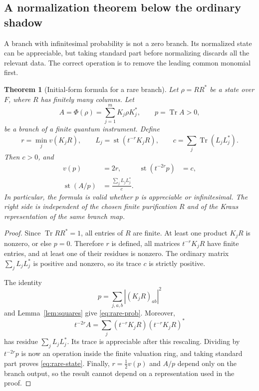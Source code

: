 \documentclass[11pt,oneside]{article}
\numberwithin{equation}{section}
\theoremstyle{plain}
\newtheorem{theorem}{Theorem}[section]
\theoremstyle{definition}
\theoremstyle{remark}
\newcommand{\st}{\operatorname{st}}
\newcommand{\Tr}{\operatorname{Tr}}
\newcommand{\abs}[1]{\left|#1\right|}
\begin{document}
\subsection{A normalization theorem below the ordinary shadow}
A branch with infinitesimal probability is not a zero branch. Its normalized state can be appreciable, but taking standard part before normalizing discards all the relevant data. The correct operation is to remove the leading common monomial first.

\begin{theorem}[Initial-form formula for a rare branch]\label{thm:rare}
Let $\rho=RR^*$ be a state over $F$, where $R$ has finitely many columns. Let
\[
 A=\Phi(\rho)=\sum_{j=1}^{m}K_j\rho K_j^*,\qquad p=\Tr A>0,
\]
be a branch of a finite quantum instrument. Define
\begin{equation}\label{eq:rare-initial}
 r=\min_jv(K_jR),\qquad
 L_j=\st(t^{-r}K_jR),\qquad
 c=\sum_j\Tr(L_jL_j^*).
\end{equation}
Then $c>0$, and
\begin{align}
 v(p)&=2r, & \st(t^{-2r}p)&=c,\label{eq:rare-prob}\\
 \st(A/p)&=\frac{\sum_jL_jL_j^*}{c}.\label{eq:rare-state}
\end{align}
In particular, the formula is valid whether $p$ is appreciable or infinitesimal. The right side is independent of the chosen finite purification $R$ and of the Kraus representation of the same branch map.
\end{theorem}
\begin{proof}
Since $\Tr RR^*=1$, all entries of $R$ are finite. At least one product $K_jR$ is nonzero, or else $p=0$. Therefore $r$ is defined, all matrices $t^{-r}K_jR$ have finite entries, and at least one of their residues is nonzero. The ordinary matrix $\sum_jL_jL_j^*$ is positive and nonzero, so its trace $c$ is strictly positive.

The identity
\[
 p=\sum_{j,a,b}\abs{(K_jR)_{ab}}^2
\]
and Lemma~\ref{lem:squares} give \eqref{eq:rare-prob}. Moreover,
\[
 t^{-2r}A=\sum_j(t^{-r}K_jR)(t^{-r}K_jR)^*
\]
has residue $\sum_jL_jL_j^*$. Its trace is appreciable after this rescaling. Dividing by $t^{-2r}p$ is now an operation inside the finite valuation ring, and taking standard part proves \eqref{eq:rare-state}. Finally, $r=\tfrac12v(p)$ and $A/p$ depend only on the branch output, so the result cannot depend on a representation used in the proof.
\end{proof}
\end{document}
